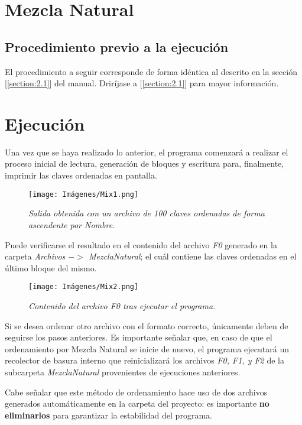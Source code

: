 \documentclass[letterpaper,12pt]{extarticle}
\begin{document}
\section{Mezcla Natural}

\subsection{Procedimiento previo a la ejecución}

\noindent El procedimiento a seguir corresponde de forma idéntica al descrito en la sección [\ref{section:2.1}] del manual. Driríjase a [\ref{section:2.1}] para mayor información.

\section{Ejecución}

\noindent Una vez que se haya realizado lo anterior, el programa comenzará a realizar el proceso inicial de lectura, generación de bloques y escritura para, finalmente, imprimir las claves ordenadas en pantalla.

\begin{figure}[h!]
\centering
\texttt{[image: Imágenes/Mix1.png]}
\caption{\textit{Salida obtenida con un archivo de 100 claves ordenadas de forma ascendente por Nombre.}}
\label{fig:Mix1}
\end{figure}

Puede verificarse el resultado en el contenido del archivo \textit{F0} generado en la carpeta \textit{Archivos $->$ MezclaNatural}; el cuál contiene las claves ordenadas en el último bloque del mismo.

\begin{figure}[h!]
\centering
\texttt{[image: Imágenes/Mix2.png]}
\caption{\textit{Contenido del archivo F0 tras ejecutar el programa.}}
\label{fig:Mix2}
\end{figure}

Si se desea ordenar otro archivo con el formato correcto, únicamente deben de seguirse los pasos anteriores. Es importante señalar que, en caso de que el ordenamiento por Mezcla Natural se inicie de nuevo, el programa ejecutará un recolector de basura interno que reinicializará los archivos \textit{F0, F1, y F2} de la subcarpeta \textit{MezclaNatural} provenientes de ejecuciones anteriores.

Cabe señalar que este método de ordenamiento hace uso de dos archivos generados automáticamente en la carpeta del proyecto: es importante \textbf{no eliminarlos} para garantizar la estabilidad del programa.
\end{document}
